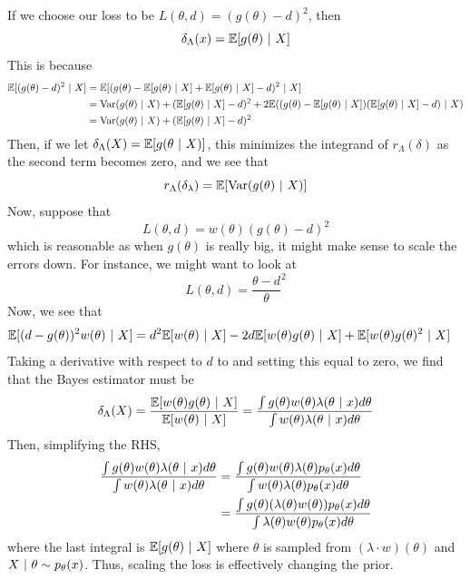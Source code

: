If we choose our loss to be $L(\theta, d) = (g(\theta) - d)^2$, then 
\[ \delta_{\Lambda}(x) = \mathbb{E}[g(\theta) \ |\  X] \]
This is because
\begin{align*}
    \mathbb{E}[(g(\theta) - d)^2 \ |\  X] &= \mathbb{E}[(g(\theta) - \mathbb{E}[g(\theta) \ |\  X] + \mathbb{E}[g(\theta) \ |\  X] - d)^2 \ |\  X]\\
    &= \text{Var}(g(\theta) \ |\  X) + (\mathbb{E}[g(\theta) \ |\  X] - d)^2 + 2\mathbb{E}((g(\theta) - \mathbb{E}[g(\theta) \ |\  X])(\mathbb{E}[g(\theta) \ |\  X] - d) \ |\  X)\\
    &= \text{Var}(g(\theta) \ |\  X) + (\mathbb{E}[g(\theta) \ |\  X] - d)^2 
\end{align*}
Then, if we let $\delta_{\Lambda}(X) = \mathbb{E}[g(\theta \ |\  X)]$, this minimizes the integrand of $r_{\Lambda}(\delta)$ as the second term becomes zero, and we see that
\[ r_{\Lambda}(\delta_{\lambda}) = \mathbb{E}[\text{Var}(g(\theta) \ |\  X)] \]
Now, suppose that 
\[ L(\theta, d) = w(\theta)(g(\theta) - d)^2 \]
which is reasonable as when $g(\theta)$ is really big, it might make sense to scale the errors down. For instance, we might want to look at
\[ L(\theta, d) = \frac{\theta - d}{\theta}^2 \]
Now, we see that
\begin{align*}
    \mathbb{E}[(d - g(\theta))^2w(\theta) \ |\  X] &= d^2\mathbb{E}[w(\theta) \ |\  X] - 2d\mathbb{E}[w(\theta)g(\theta) \ |\  X] + \mathbb{E}[w(\theta)g(\theta)^2 \ |\  X]
\end{align*}
Taking a derivative with respect to $d$ to and setting this equal to zero, we find that the Bayes estimator must be
\[ \delta_{\Lambda}(X) = \frac{\mathbb{E}[w(\theta)g(\theta) \ |\  X]}{\mathbb{E}[w(\theta) \ |\  X]} = \frac{\int g(\theta)w(\theta)\lambda(\theta \ |\  x)d\theta}{\int w(\theta)\lambda(\theta \ |\  x)d\theta} \]
Then, simplifying the RHS, 
\begin{align*}
    \frac{\int g(\theta)w(\theta)\lambda(\theta \ |\  x)d\theta}{\int w(\theta)\lambda(\theta \ |\  x)d\theta} &= \frac{\int g(\theta)w(\theta)\lambda(\theta)p_{\theta}(x)d\theta}{\int w(\theta)\lambda(\theta)p_{\theta}(x)d\theta}\\
    &= \frac{\int g(\theta) (\lambda(\theta)w(\theta))p_{\theta}(x)d\theta}{\int \lambda(\theta)w(\theta)p_{\theta}(x)d\theta}
\end{align*}
where the last integral is $\mathbb{E}[g(\theta) \ |\  X]$ where $\theta$ is sampled from $(\lambda \cdot w)(\theta)$ and $X \ |\  \theta \sim p_{\theta}(x)$. Thus, scaling the loss is effectively changing the prior.

